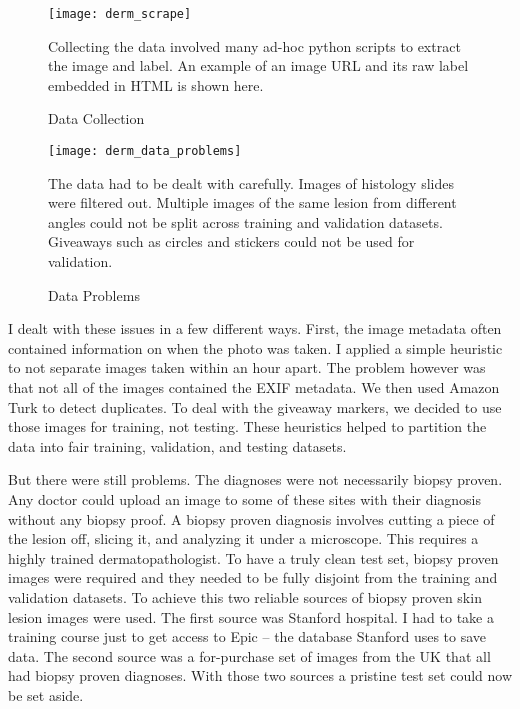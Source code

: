 \begin{figure}
\texttt{[image: derm\_scrape]}
\caption{Data Collection}
\vspace{12px}
Collecting the data involved many ad-hoc python scripts to extract the image and label.  An example of an image URL and its raw label embedded in HTML is shown here.
\label{fig:derm_scrape}
\end{figure}

\begin{figure}
\texttt{[image: derm\_data\_problems]}
\caption{Data Problems}
\vspace{12px}
The data had to be dealt with carefully.  Images of histology slides were filtered out.  Multiple images of the same lesion from different angles could not be split across training and validation datasets.  Giveaways such as circles and stickers could not be used for validation.
\label{fig:derm_data_problems}
\end{figure}

I dealt with these issues in a few different ways.  First, the image metadata often contained information on when the photo was taken.  I applied a simple heuristic to not separate images taken within an hour apart.  The problem however was that not all of the images contained the EXIF metadata.  We then used Amazon Turk to detect duplicates.  To deal with the giveaway markers, we decided to use those images for training, not testing.  These heuristics helped to partition the data into fair training, validation, and testing datasets.

But there were still problems.  The diagnoses were not necessarily biopsy proven.  Any doctor could upload an image to some of these sites with their diagnosis without any biopsy proof.  A biopsy proven diagnosis involves cutting a piece of the lesion off, slicing it, and analyzing it under a microscope.  This requires a highly trained dermatopathologist.  To have a truly clean test set, biopsy proven images were required and they needed to be fully disjoint from the training and validation datasets.  To achieve this two reliable sources of biopsy proven skin lesion images were used.  The first source was Stanford hospital.  I had to take a training course just to get access to Epic -- the database Stanford uses to save data.  The second source was a for-purchase set of images from the UK that all had biopsy proven diagnoses.  With those two sources a pristine test set could now be set aside.

